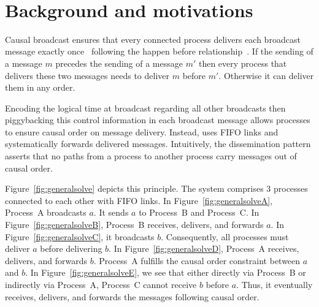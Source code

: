 
\begin{figure*}
  \begin{center}
    \hspace{30pt}
    \hspace{30pt}
    \\
    \hspace{30pt}
    \caption{\label{fig:generalsolve}Causal broadcast~\cite{friedman2004causal}
      ensures causal order.}
  \end{center}
\end{figure*}


\section{Background and motivations}
\label{sec:motivations}

Causal broadcast ensures that every connected process delivers each broadcast
message exactly once~\cite{hadzilacos1994modular} following the happen before
relationship~\cite{lamport1978time}. If the sending of a message $m$ precedes
the sending of a message $m'$ then every process that delivers these two
messages needs to deliver $m$ before $m'$. Otherwise it can deliver them in any
order.

Encoding the logical time at broadcast regarding all other broadcasts then
piggybacking this control information in each broadcast message allows processes
to ensure causal order on message delivery. Instead, \cite{friedman2004causal}
uses FIFO links and systematically forwards delivered messages.  Intuitively,
the dissemination pattern asserts that no paths from a process to another
process carry messages out of causal order.

Figure~\ref{fig:generalsolve} depicts this principle. The system comprises 3
processes connected to each other with FIFO links.  In
Figure~\ref{fig:generalsolveA}, Process~A broadcasts $a$. It sends $a$ to
Process~B and Process~C. In Figure~\ref{fig:generalsolveB}, Process~B receives,
delivers, and forwards $a$. In Figure~\ref{fig:generalsolveC}, it broadcasts
$b$. Consequently, all processes must deliver $a$ before delivering $b$. In
Figure~\ref{fig:generalsolveD}, Process~A receives, delivers, and forwards
$b$. Process~A fulfills the causal order constraint between $a$ and $b$. In
Figure~\ref{fig:generalsolveE}, we see that either directly via Process~B or
indirectly via Process~A, Process~C cannot receive $b$ before $a$. Thus, it
eventually receives, delivers, and forwards the messages following causal order.


